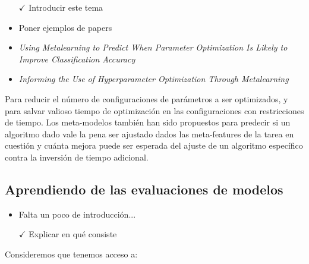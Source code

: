 \begin{itemize}
	\item[$\checkmark$] Introducir este tema
	\item Poner ejemplos de papers
	\item \textit{Using Metalearning to Predict When Parameter Optimization Is Likely to Improve Classification Accuracy}
	\item \textit{Informing the Use of Hyperparameter Optimization Through Metalearning}
\end{itemize}

Para reducir el número de configuraciones de parámetros a ser optimizados, y para salvar valioso tiempo de optimización en las configuraciones con restricciones de tiempo. Los meta-modelos también han sido propuestos para predecir si un algoritmo dado vale la pena ser ajustado dados las meta-features de la tarea en cuestión y cuánta mejora puede ser esperada del ajuste de un algoritmo específico contra la inversión de tiempo adicional.

%

\subsection{Aprendiendo de las evaluaciones de modelos}\label{subsec:mtl_automl_evaluations}

\begin{itemize}
	\item Falta un poco de introducción...
	\item[$\checkmark$] Explicar en qué consiste
\end{itemize}

Consideremos que tenemos acceso a:

